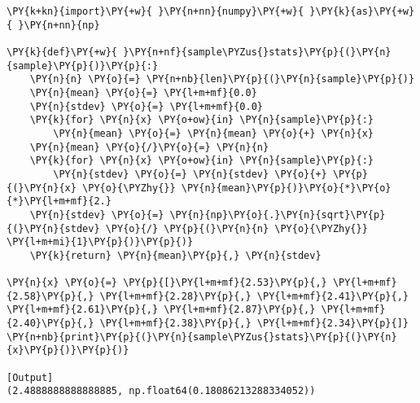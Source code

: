 \begin{Verbatim}[label=\makebox{\href{https://github.com/unipi-physics-labs/lab1-notes/tree/main/snippy/sample_stat_naive.py}{https://github.com/.../sample\_stat\_naive.py}},commandchars=\\\{\}]
\PY{k+kn}{import}\PY{+w}{ }\PY{n+nn}{numpy}\PY{+w}{ }\PY{k}{as}\PY{+w}{ }\PY{n+nn}{np}

\PY{k}{def}\PY{+w}{ }\PY{n+nf}{sample\PYZus{}stats}\PY{p}{(}\PY{n}{sample}\PY{p}{)}\PY{p}{:}
    \PY{n}{n} \PY{o}{=} \PY{n+nb}{len}\PY{p}{(}\PY{n}{sample}\PY{p}{)}
    \PY{n}{mean} \PY{o}{=} \PY{l+m+mf}{0.0}
    \PY{n}{stdev} \PY{o}{=} \PY{l+m+mf}{0.0}
    \PY{k}{for} \PY{n}{x} \PY{o+ow}{in} \PY{n}{sample}\PY{p}{:}
        \PY{n}{mean} \PY{o}{=} \PY{n}{mean} \PY{o}{+} \PY{n}{x}
    \PY{n}{mean} \PY{o}{/}\PY{o}{=} \PY{n}{n}
    \PY{k}{for} \PY{n}{x} \PY{o+ow}{in} \PY{n}{sample}\PY{p}{:}
        \PY{n}{stdev} \PY{o}{=} \PY{n}{stdev} \PY{o}{+} \PY{p}{(}\PY{n}{x} \PY{o}{\PYZhy{}} \PY{n}{mean}\PY{p}{)}\PY{o}{*}\PY{o}{*}\PY{l+m+mf}{2.}
    \PY{n}{stdev} \PY{o}{=} \PY{n}{np}\PY{o}{.}\PY{n}{sqrt}\PY{p}{(}\PY{n}{stdev} \PY{o}{/} \PY{p}{(}\PY{n}{n} \PY{o}{\PYZhy{}} \PY{l+m+mi}{1}\PY{p}{)}\PY{p}{)}
    \PY{k}{return} \PY{n}{mean}\PY{p}{,} \PY{n}{stdev}

\PY{n}{x} \PY{o}{=} \PY{p}{[}\PY{l+m+mf}{2.53}\PY{p}{,} \PY{l+m+mf}{2.58}\PY{p}{,} \PY{l+m+mf}{2.28}\PY{p}{,} \PY{l+m+mf}{2.41}\PY{p}{,} \PY{l+m+mf}{2.61}\PY{p}{,} \PY{l+m+mf}{2.87}\PY{p}{,} \PY{l+m+mf}{2.40}\PY{p}{,} \PY{l+m+mf}{2.38}\PY{p}{,} \PY{l+m+mf}{2.34}\PY{p}{]}
\PY{n+nb}{print}\PY{p}{(}\PY{n}{sample\PYZus{}stats}\PY{p}{(}\PY{n}{x}\PY{p}{)}\PY{p}{)}

[Output]
(2.4888888888888885, np.float64(0.18086213288334052))
\end{Verbatim}
